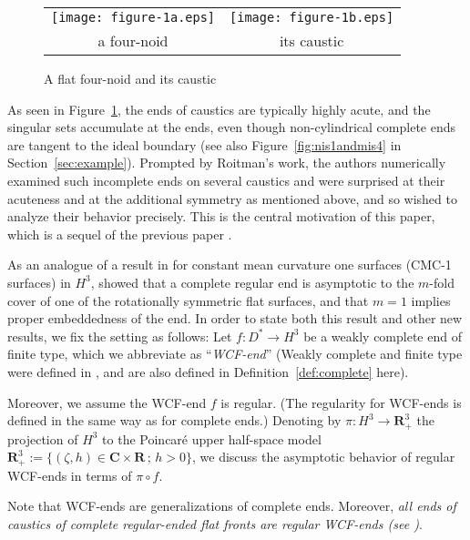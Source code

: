 \documentclass[a4paper]{amsart}
\theoremstyle{plain}
\theoremstyle{remark}
\numberwithin{equation}{section}
\begin{document}
\begin{figure}
\begin{center}
 \begin{tabular}{cc}
  \texttt{[image: figure-1a.eps]} &
  \texttt{[image: figure-1b.eps]} \\
  a four-noid & its caustic 
\end{tabular}
\end{center}
\caption{A flat four-noid and its caustic}\label{fig:caustic}
\end{figure}

As seen in Figure~\ref{fig:caustic}, the ends of caustics are typically
highly acute, 
and the singular sets accumulate at the ends, even though
non-cylindrical complete ends are tangent to the ideal boundary
(see also Figure~\ref{fig:nis1andmis4} in Section~\ref{sec:example}).
Prompted by Roitman's work, the authors numerically examined such
incomplete ends on several caustics and were surprised 
at their acuteness and 
at the additional symmetry as mentioned above, 
and so wished to analyze their behavior precisely. 
This is the central motivation of this paper, 
which is a sequel of the previous paper \cite{KRUY}.

As an analogue of a result in \cite{UY} for constant mean curvature one
surfaces (CMC-1 surfaces) in $H^3$,
\cite{GMM} showed that a complete regular end is asymptotic to the
$m$-fold cover of one of the rotationally symmetric flat surfaces, 
and that $m=1$ implies proper embeddedness of the end.  
In order to state both this result and other new results,
we fix the setting as follows: Let $f\colon D^* \to H^3$ be a weakly
complete end of finite type, 
which we abbreviate as ``{\em WCF-end\/}'' 
(Weakly complete and finite type were defined in \cite{KRUY}, and are
also defined in Definition~\ref{def:complete} here).

Moreover, we assume the WCF-end $f$ is regular. 
(The regularity for WCF-ends is defined in the same way as for complete
ends.)
Denoting by $\pi \colon H^3 \to {\boldsymbol{R}}^3_+$ the projection of $H^3$ 
to the Poincar\'e upper half-space model 
${\boldsymbol{R}}^3_+:=\{ (\zeta,h)\in {\boldsymbol{C}}\times {\boldsymbol{R}}\,;\, h>0\}$, 
we discuss the asymptotic behavior of regular WCF-ends in terms of 
$\pi\circ f$.

Note that WCF-ends are generalizations of complete ends. 
Moreover, 
{\it all ends of caustics of complete regular-ended flat fronts are 
regular WCF-ends 
{\rm (}see \cite[Theorems 7.4 and 7.6]{KRUY}{\rm )}}.
\end{document}
